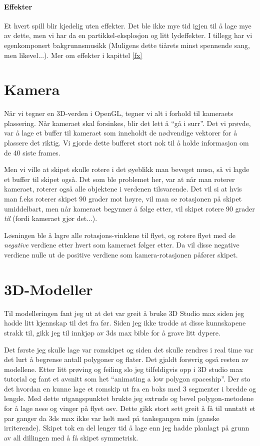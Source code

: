 \documentclass[11pt, dvips]{report}
\begin{document}
\subsubsection{Effekter}

Et hvert spill blir kjedelig uten effekter. Det ble ikke mye tid igjen
til å lage mye av dette, men vi har da en partikkel-eksplosjon og litt
lydeffekter. I tillegg har vi egenkomponert bakgrunnsmusikk (Muligens
dette tiårets minst spennende sang, men likevel...). Mer om effekter i
kapittel \ref{fx}

\chapter{Kamera}\label{camera}

Når vi tegner en 3D-verden i OpenGL, tegner vi alt i forhold til
kameraets plassering. Når kameraet skal forsinkes, blir det lett å
``gå i surr''. Det vi prøvde, var å lage et buffer til kameraet som
inneholdt de nødvendige vektorer for å plassere det riktig. Vi gjorde
dette bufferet stort nok til å holde informasjon om de 40 siste
frames.

Men vi ville at skipet skulle rotere i det øyeblikk man beveget musa,
så vi lagde et buffer til skipet også. Det som ble problemet her, var
at når man roterer kameraet, roterer også alle objektene i verdenen
tilsvarende. Det vil si at hvis man f.eks roterer skipet 90 grader mot
høyre, vil man se rotasjonen på skipet umiddelbart, men når kameraet
begynner å følge etter, vil skipet rotere 90 grader \emph{til} (fordi
kameraet gjør det...).

Løsningen ble å lagre alle rotasjons-vinklene til flyet, og rotere
flyet med de \emph{negative} verdiene etter hvert som kameraet følger
etter. Da vil disse negative verdiene nulle ut de positive verdiene
som kamera-rotasjonen påfører skipet.

\chapter{3D-Modeller}\label{3dmodel}

Til modelleringen fant jeg ut at det var greit å bruke 3D Studio max
siden jeg hadde litt kjennskap til det fra før. Siden jeg ikke trodde
at disse kunnskapene strakk til, gikk jeg til innkjøp av 3ds max bible
for å grave litt dypere.

Det første jeg skulle lage var romskipet og siden det skulle rendres i
real time var det lurt å begrense antall polygoner og flater. Det
gjaldt forøvrig også resten av modellene.  Etter litt prøving og
feiling slo jeg tilfeldigvis opp i 3D studio max tutorial og fant et
avsnitt som het ``animating a low polygon spaceship''. Der sto det
hvordan en kunne lage et romskip ut fra en boks med 3 segmenter i
bredde og lengde. Med dette utgangspunktet brukte jeg extrude og bevel
polygon-metodene for å lage nese og vinger på flyet osv. Dette gikk
stort sett greit å få til unntatt et par ganger da 3ds max ikke var
helt med på tankegangen min (ganske irriterende). Skipet tok en del
lenger tid å lage enn jeg hadde planlagt på grunn av all dillingen med
å få skipet symmetrisk.
\end{document}
